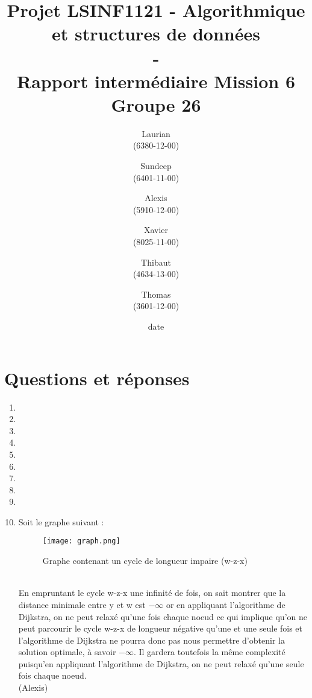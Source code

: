 \documentclass[11pt]{article}
\title{\textbf{Projet LSINF1121 -  Algorithmique et structures de données\\ - \\ Rapport intermédiaire Mission 6} \\ {\large Groupe 26}}
\author{Laurian \bsc{Detiffe} \\(6380-12-00)\and Sundeep \bsc{Dhillon} \\(6401-11-00)\and Alexis \bsc{Macq} \\ (5910-12-00) \and Xavier \bsc{Pérignon} \\ (8025-11-00)\and Thibaut \bsc{Piquard}\\(4634-13-00)\and Thomas \bsc{Wyckmans} \\ (3601-12-00)}
\date{date}
\date{\vspace*{25mm}
\texttt{[image: logo.jpg]}\\
		\vspace*{30mm}
		\begin{center}
		Année académique 2015-2016 \\	
		\end{center}}
\begin{document}
\thispagestyle{empty}

\maketitle
\thispagestyle{empty}

\section*{Questions et réponses}
\begin{enumerate}

\item

\item  

\item 

\item 

\item 

\item 

\item 

\item 

\item 

\item Soit le graphe suivant :\\

\begin{figure}[h!]
    \center
    \texttt{[image: graph.png]}
    \caption{Graphe contenant un cycle de longueur impaire (w-z-x)}
\end{figure}\\

En empruntant le cycle w-z-x une infinité de fois, on sait montrer que 
la distance minimale entre y et w est $ -\infty $ 
or en appliquant l'algorithme de Dijkstra, 
on ne peut relaxé qu'une fois chaque noeud ce qui implique qu'on ne peut parcourir
le cycle w-z-x de longueur négative qu'une et une seule fois et l'algorithme 
de Dijkstra ne pourra donc pas nous permettre d'obtenir la solution optimale,
 à savoir $ -\infty $. Il gardera toutefois la même complexité puisqu'en appliquant 
 l'algorithme de Dijkstra, on ne peut relaxé qu'une seule fois chaque noeud.\\

(Alexis)\\


\end{enumerate}
\end{document}
